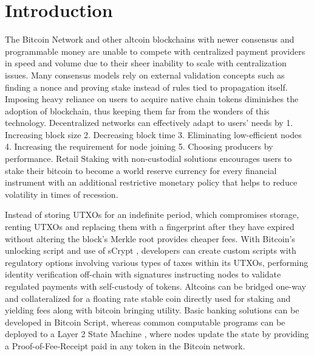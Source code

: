 \documentclass[../Bitcoin Blink.tex]{subfiles}
\begin{document}
\section{Introduction}
The Bitcoin Network \cite{nakamoto2008bitcoin} and other altcoin blockchains with newer consensus and programmable money are unable to compete with centralized payment providers in speed and volume due to their sheer inability to scale with centralization issues. Many consensus models rely on external validation concepts such as finding a nonce and proving stake instead of rules tied to propagation itself. Imposing heavy reliance on users to acquire native chain tokens diminishes the adoption of blockchain, thus keeping them far from the wonders of this technology. Decentralized networks can effectively adapt to users’ needs by 1. Increasing block size 2. Decreasing block time 3. Eliminating low-efficient nodes 4. Increasing the requirement for node joining 5. Choosing producers by performance. Retail Staking with non-custodial solutions encourages users to stake their bitcoin to become a world reserve currency for every financial instrument with an additional restrictive monetary policy that helps to reduce volatility in times of recession.

Instead of storing UTXOs for an indefinite period, which compromises storage, renting UTXOs and replacing them with a fingerprint after they have expired without altering the block’s Merkle root provides cheaper fees. With Bitcoin’s unlocking script and use of sCrypt \cite{sCrypt}, developers can create custom scripts with regulatory options involving various types of taxes within its UTXOs, performing identity verification off-chain with signatures instructing nodes to validate regulated payments with self-custody of tokens. Altcoins can be bridged one-way and collateralized for a floating rate stable coin directly used for staking and yielding fees along with bitcoin bringing utility. Basic banking solutions can be developed in Bitcoin Script, whereas common computable programs can be deployed to a Layer 2 State Machine \cite{wood2014ethereum}, where nodes update the state by providing a Proof-of-Fee-Receipt paid in any token in the Bitcoin network.
\end{document}

